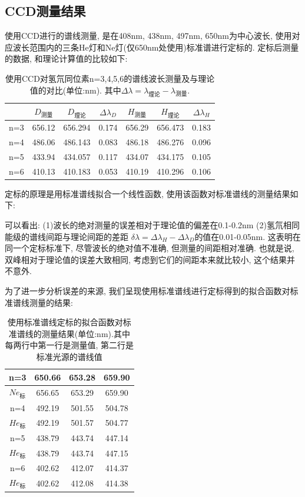 \documentclass[12pt,a4paper]{article}
\begin{document}
\subsection{CCD测量结果}
使用CCD进行的谱线测量, 是在408nm, 438nm, 497nm, 650nm为中心波长, 使用对应波长范围内的三条He灯和Ne灯(仅650nm处使用)标准谱进行定标的.
定标后测量的数据, 和理论计算值的比较如下:  
\begin{table}[H]
    \centering
    \begin{tabular}{|c|c|c|c|c|c|c|}
    \hline
        & $D_{\text{测量}}$      & $D_{\text{理论}}$      & $\Delta \lambda_{D} $ & $H_{\text{测量}}$      & $H_{\text{理论}}$     & $\Delta \lambda_{H} $  \\ \hline
    n=3 & 656.12 & 656.294 & 0.174 & 656.29 & 656.473 & 0.183 \\ \hline
    n=4 & 486.06 & 486.143 & 0.083 & 486.18 & 486.276 & 0.096 \\ \hline
    n=5 & 433.94 & 434.057 & 0.117 & 434.07 & 434.175 & 0.105 \\ \hline
    n=6 & 410.13 & 410.183 & 0.053 & 410.19 & 410.296 & 0.106 \\ \hline
    \end{tabular}
    \caption{使用CCD对氢氘同位素n=3,4,5,6的谱线波长测量及与理论值的对比(单位:nm).
    其中$\Delta \lambda=\lambda_{\text{理论}}-\lambda_{\text{测量}}$.}
    \end{table}

定标的原理是用标准谱线拟合一个线性函数, 使用该函数对标准谱线的测量结果如下:

可以看出: (1)波长的绝对测量的误差相对于理论值的偏差在0.1-0.2nm (2)氢氘相同能级的谱线间距与理论间距的差距
$\delta \lambda=\Delta \lambda_{H}-\Delta \lambda_{D}$的值在0.01-0.05nm. 这表明在同一个定标标准下, 尽管波长的绝对值不准确, 但测量的间距相对准确. 
也就是说, 双峰相对于理论值的误差大致相同, 考虑到它们的间距本来就比较小, 这个结果并不意外. 

为了进一步分析误差的来源, 我们呈现使用标准谱线进行定标得到的拟合函数对标准谱线测量的结果: 

\begin{table}[H]
    \centering
    \begin{tabular}{|c|c|c|c|}
    
    \hline
    n=3 & 650.66 & 653.28 & 659.90 \\ \hline
    $Ne_{\text{标}}$  & 656.65 & 653.29 & 659.90 \\ \hline
    n=4 & 492.19 & 501.55 & 504.78 \\ \hline
    $He_{\text{标}}$  & 492.19 & 501.57 & 504.77 \\ \hline
    n=5 & 438.79 & 443.74 & 447.14 \\ \hline
    $He_{\text{标}}$  & 438.79 & 443.74 & 447.15 \\ \hline
    n=6 & 402.62 & 412.07 & 414.37 \\ \hline
    $He_{\text{标}}$  & 402.62 & 412.08 & 414.38 \\ \hline
    \end{tabular}

    \caption{使用标准谱线定标的拟合函数对标准谱线的测量结果(单位:nm).其中每两行中第一行是测量值, 第二行是标准光源的谱线值}
    \end{table}
\end{document}
